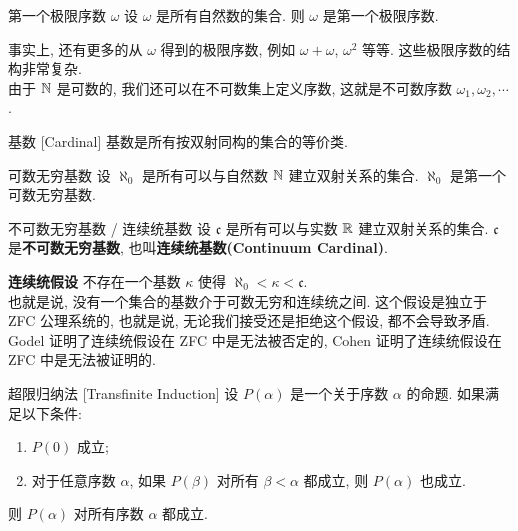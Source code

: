         \begin{ins}
            {第一个极限序数 \(\omega\)}
            设 \(\omega\) 是所有自然数的集合. 则 \(\omega\) 是第一个极限序数.
        \end{ins}

        \begin{rmk}
            [Dedicatia]
            事实上, 还有更多的从 \(\omega\) 得到的极限序数, 例如 \(\omega+\omega\), \(\omega^2\) 等等. 这些极限序数的结构非常复杂. \\
            由于 \(\operatorname{\mathbb{N}}\) 是可数的, 我们还可以在不可数集上定义序数, 这就是不可数序数 \(\omega_1, \omega_2, \cdots\).
        \end{rmk}

        \begin{vardfn}
            [cardinal]
            {基数}
            [Cardinal]
            基数是所有按双射同构的集合的等价类.
        \end{vardfn}

        \begin{ins}
            {可数无穷基数}
            设 \(\aleph_0\) 是所有可以与自然数 \(\operatorname{\mathbb{N}}\) 建立双射关系的集合. \(\aleph_0\) 是第一个可数无穷基数.
        \end{ins}

        \begin{ins}
            {不可数无穷基数 / 连续统基数}
            设 \(\mathfrak{c}\) 是所有可以与实数 \(\operatorname{\mathbb{R}}\) 建立双射关系的集合. \(\mathfrak{c}\) 是\textbf{不可数无穷基数}, 也叫\textbf{连续统基数(Continuum Cardinal)}.
        \end{ins}

        \begin{rmk}
            [Dedicatia]
            \textbf{连续统假设}\; 不存在一个基数 \(\kappa\) 使得 \(\aleph_0 < \kappa < \mathfrak{c}\). \\
            也就是说, 没有一个集合的基数介于可数无穷和连续统之间. 这个假设是独立于 ZFC 公理系统的, 也就是说, 无论我们接受还是拒绝这个假设, 都不会导致矛盾. Godel 证明了连续统假设在 ZFC 中是无法被否定的, Cohen 证明了连续统假设在 ZFC 中是无法被证明的.
        \end{rmk}

        \begin{thm}
            {超限归纳法}
            [Transfinite Induction]
            设 \(P(\alpha)\) 是一个关于序数 \(\alpha\) 的命题. 如果满足以下条件:
            \begin{enumerate}[label=(\roman*)]
                \item \(P(0)\) 成立;
                \item 对于任意序数 \(\alpha\), 如果 \(P(\beta)\) 对所有 \(\beta<\alpha\) 都成立, 则 \(P(\alpha)\) 也成立.
            \end{enumerate}
            则 \(P(\alpha)\) 对所有序数 \(\alpha\) 都成立.
        \end{thm}

